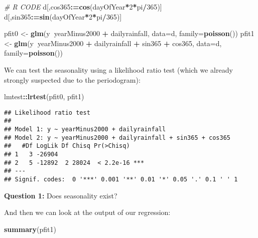 \documentclass[]{book}
\newenvironment{Shaded}{\begin{snugshade}}{\end{snugshade}}
\newcommand{\KeywordTok}[1]{\textcolor[rgb]{0.13,0.29,0.53}{\textbf{#1}}}
\newcommand{\DataTypeTok}[1]{\textcolor[rgb]{0.13,0.29,0.53}{#1}}
\newcommand{\DecValTok}[1]{\textcolor[rgb]{0.00,0.00,0.81}{#1}}
\newcommand{\StringTok}[1]{\textcolor[rgb]{0.31,0.60,0.02}{#1}}
\newcommand{\CommentTok}[1]{\textcolor[rgb]{0.56,0.35,0.01}{\textit{#1}}}
\newcommand{\OperatorTok}[1]{\textcolor[rgb]{0.81,0.36,0.00}{\textbf{#1}}}
\newcommand{\ErrorTok}[1]{\textcolor[rgb]{0.64,0.00,0.00}{\textbf{#1}}}
\newcommand{\NormalTok}[1]{#1}
\begin{document}
\begin{Shaded}
\begin{Highlighting}[]
\CommentTok{# R CODE}
\NormalTok{d[,cos365}\OperatorTok{:}\ErrorTok{=}\KeywordTok{cos}\NormalTok{(dayOfYear}\OperatorTok{*}\DecValTok{2}\OperatorTok{*}\NormalTok{pi}\OperatorTok{/}\DecValTok{365}\NormalTok{)]}
\NormalTok{d[,sin365}\OperatorTok{:}\ErrorTok{=}\KeywordTok{sin}\NormalTok{(dayOfYear}\OperatorTok{*}\DecValTok{2}\OperatorTok{*}\NormalTok{pi}\OperatorTok{/}\DecValTok{365}\NormalTok{)]}

\NormalTok{pfit0 <-}\StringTok{ }\KeywordTok{glm}\NormalTok{(y}\OperatorTok{~}\NormalTok{yearMinus2000 }\OperatorTok{+}\StringTok{ }\NormalTok{dailyrainfall, }\DataTypeTok{data=}\NormalTok{d, }\DataTypeTok{family=}\KeywordTok{poisson}\NormalTok{())}
\NormalTok{pfit1 <-}\StringTok{ }\KeywordTok{glm}\NormalTok{(y}\OperatorTok{~}\NormalTok{yearMinus2000 }\OperatorTok{+}\StringTok{ }\NormalTok{dailyrainfall }\OperatorTok{+}\StringTok{ }\NormalTok{sin365 }\OperatorTok{+}\StringTok{ }\NormalTok{cos365, }\DataTypeTok{data=}\NormalTok{d, }\DataTypeTok{family=}\KeywordTok{poisson}\NormalTok{())}
\end{Highlighting}
\end{Shaded}

We can test the seasonality using a likelihood ratio test (which we
already strongly suspected due to the periodogram):

\begin{Shaded}
\begin{Highlighting}[]
\NormalTok{lmtest}\OperatorTok{::}\KeywordTok{lrtest}\NormalTok{(pfit0, pfit1)}
\end{Highlighting}
\end{Shaded}

\begin{verbatim}
## Likelihood ratio test
## 
## Model 1: y ~ yearMinus2000 + dailyrainfall
## Model 2: y ~ yearMinus2000 + dailyrainfall + sin365 + cos365
##   #Df LogLik Df Chisq Pr(>Chisq)    
## 1   3 -26904                        
## 2   5 -12892  2 28024  < 2.2e-16 ***
## ---
## Signif. codes:  0 '***' 0.001 '**' 0.01 '*' 0.05 '.' 0.1 ' ' 1
\end{verbatim}

\textbf{Question 1:} Does seasonality exist?

And then we can look at the output of our regression:

\begin{Shaded}
\begin{Highlighting}[]
\KeywordTok{summary}\NormalTok{(pfit1)}
\end{Highlighting}
\end{Shaded}
\end{document}
